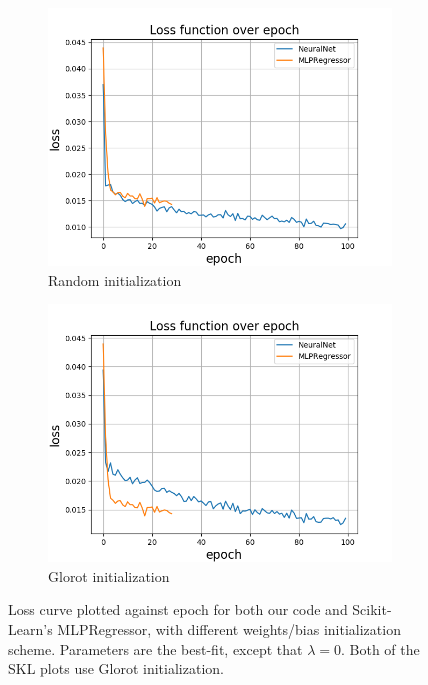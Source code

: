 \documentclass[a4paper]{article}
\begin{document}
\begin{figure}[H]
  \centering
  \begin{subfigure}{0.49\textwidth}
    \includegraphics[scale=0.45]{../figures/task_b/minibatch1/loss.png}
    \caption{Random initialization}
  \end{subfigure}
  \begin{subfigure}{0.49\textwidth}
    \includegraphics[scale=0.45]{../figures/task_b/minibatch1_glorot/loss.png}
    \caption{Glorot initialization}
  \end{subfigure}
  \caption{Loss curve plotted against epoch for both our code and Scikit-Learn's MLPRegressor, with different weights/bias initialization scheme. Parameters are the best-fit, except that $\lambda = 0$. Both of the SKL plots use Glorot initialization.}
  \label{fig:nn_franke_skl_init}
\end{figure}
\end{document}
